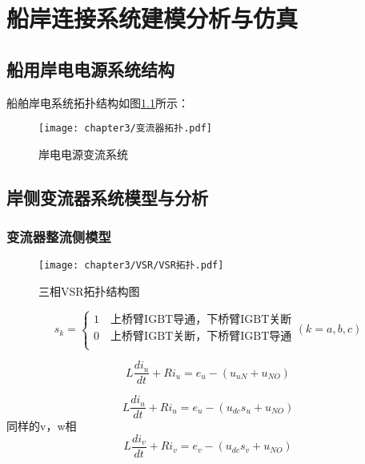 \chapter{船岸连接系统建模分析与仿真}

\section{船用岸电电源系统结构}

船舶岸电系统拓扑结构如图\ref{fig:岸电电源变流系统}所示：

\begin{figure}[!htp]
	\centering
	\texttt{[image: chapter3/变流器拓扑.pdf]}
	\caption{岸电电源变流系统}
	\label{fig:岸电电源变流系统}
\end{figure}

\section{岸侧变流器系统模型与分析}

\subsection{变流器整流侧模型}

\begin{figure}[!htp]
	\centering
	\texttt{[image: chapter3/VSR/VSR拓扑.pdf]}
	\caption{三相VSR拓扑结构图}
	\label{fig:三相VSR拓扑结构图}
\end{figure}

\begin{equation}
	s_{k} =
	\begin{cases}
		1 \quad \text{上桥臂IGBT导通，下桥臂IGBT关断} \\
		0 \quad \text{上桥臂IGBT关断，下桥臂IGBT导通} \\
	\end{cases}
	(k=a,b,c)
	\label{equ:Sk}
\end{equation}

\begin{equation}
	L\frac{di_{u}}{dt}+Ri_{u}=e_{u}-(u_{uN}+u_{NO})
	\label{equ:3-3}
\end{equation}

\begin{equation}
	L\frac{di_{u}}{dt}+Ri_{u}=e_{u}-(u_{dc}s_{u}+u_{NO})
\end{equation}
同样的v，w相
\begin{equation}
	L\frac{di_{v}}{dt}+Ri_{v}=e_{v}-(u_{dc}s_{v}+u_{NO})
	\label{equ:3-4}
\end{equation}

